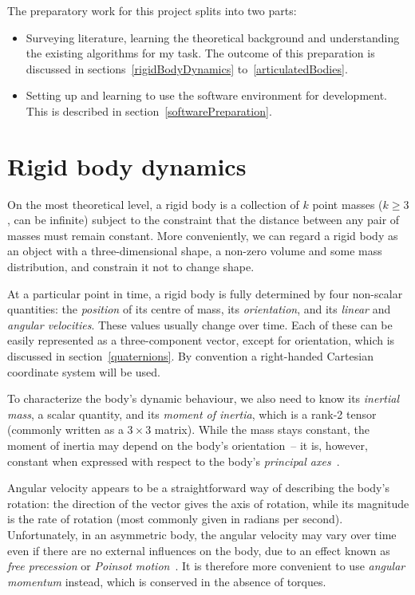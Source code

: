The preparatory work for this project splits into two parts:
\begin{itemize}
\item Surveying literature, learning the theoretical background and understanding the existing
    algorithms for my task. The outcome of this preparation is discussed in
    sections~\ref{rigidBodyDynamics} to~\ref{articulatedBodies}.
\item Setting up and learning to use the software environment for development. This is described
    in section~\ref{softwarePreparation}.
\end{itemize}

\section{Rigid body dynamics\label{rigidBodyDynamics}}
On the most theoretical level, a rigid body is a collection of $k$ point masses ($k \ge 3$,
can be infinite) subject to the constraint that the distance between any pair of masses must
remain constant. More conveniently, we can regard a rigid body as an object with a
three-dimensional shape, a non-zero volume and some mass distribution, and constrain it not to
change shape.

At a particular point in time, a rigid body is fully determined by four non-scalar quantities: the
\emph{position} of its centre of mass, its \emph{orientation}, and its \emph{linear} and
\emph{angular velocities}. These values usually change over time. Each of these can be easily
represented as a three-component vector, except for orientation, which is discussed in
section~\ref{quaternions}. By convention a right-handed Cartesian coordinate system will be used.

To characterize the body's dynamic behaviour, we also need to know its \emph{inertial mass},
a scalar quantity, and its \emph{moment of inertia}, which is a rank-2 tensor (commonly written
as a $3\times3$ matrix). While the mass stays constant, the moment of inertia may
depend on the body's orientation~-- it is, however, constant when expressed with respect to the
body's \emph{principal axes}~\cite{Feynman:63,Goldstein:80}.

Angular velocity appears to be a straightforward way of describing the body's rotation: the
direction of the vector gives the axis of rotation, while its magnitude is the rate of rotation
(most commonly given in radians per second). Unfortunately, in an asymmetric body, the angular
velocity may vary over time even if there are no external influences on the body, due to an effect
known as \emph{free precession} or \emph{Poinsot motion}~\cite{Goldstein:80,Julian:notes}. It is
therefore more convenient to use \emph{angular momentum} instead, which is conserved in the
absence of torques.

